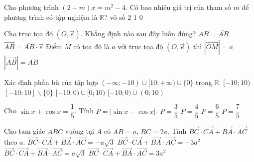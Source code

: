 \begin{ex}%
        Cho phương trình $(2-m)x=m^2-4$. Có bao nhiêu giá trị của tham số $m$ để phương trình có tập nghiệm là $\mathbb{R}$?
        \choice        
        {vô số}
        {$2$}
        {\True $1$}
        {$0$}
\end{ex}
\begin{ex}%
        Cho trục tọa độ $(O,\vec{e})$. Khẳng định nào sau đây luôn đúng?
        \choice        
        {$AB=\overline{AB}$}
        {\True $\vec{AB}=\overline{AB}\cdot \vec{e}$}
        {Điểm $M$ có tọa độ là $a$ với trục tọa độ $(O,\vec{e})$ thì $|\vec{OM}|=a$}
        {$|\vec{AB}|=\overline{AB}$}
\end{ex}
\begin{ex}%
        Xác định phần bù của tập hợp $(-\infty;-10)\cup [10;+\infty)\cup \{0\}$ trong $\mathbb{R}$.
        \choice        
        {$[-10;10)$}
        {$[-10;10]\backslash \{0\}$}
        {$[-10;0)\cup[0;10)$}
        {\True $[-10;0)\cup(0;10)$}
	\loigiai{
	$[-10;10)\backslash \{0\}$.	
	}
\end{ex}
\begin{ex}%
        Cho $\sin x +\cos x =\dfrac{1}{5}$. Tính $P=|\sin x-\cos x|$.
        \choice        
        {$P=\dfrac{3}{5}$}
        {$P=\dfrac{4}{5}$}
        {$P=\dfrac{6}{5}$}
        {\True $P=\dfrac{7}{5}$}
\end{ex}
\begin{ex}%
        Cho tam giác $ABC$ vuông tại $A$ có $AB=a$, $BC=2a$. Tính $\vec{BC}\cdot \vec{CA}+\vec{BA}\cdot \vec{AC}$ theo $a$.
        \choice        
        {$\vec{BC}\cdot \vec{CA}+\vec{BA}\cdot \vec{AC}=-a\sqrt{3}$}
        {\True $\vec{BC}\cdot \vec{CA}+\vec{BA}\cdot \vec{AC}=-3a^2$}
        {$\vec{BC}\cdot \vec{CA}+\vec{BA}\cdot \vec{AC}=a\sqrt{3}$}
        {$\vec{BC}\cdot \vec{CA}+\vec{BA}\cdot \vec{AC}=3a^2$}
\end{ex}

